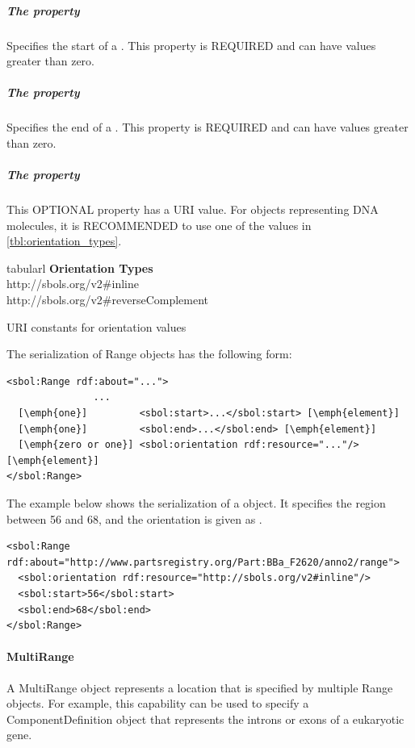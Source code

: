 \subparagraph{The  property}
Specifies the start of a . This property is REQUIRED and can have  values greater than zero.

\subparagraph{The  property}
Specifies the end of a . This property is REQUIRED and can have  values greater than zero.

\subparagraph{The  property}
This OPTIONAL property has a URI value. For  objects representing DNA molecules, it is RECOMMENDED to use one of the values in \ref{tbl:orientation_types}. 

\begin{table}[ht]
  \begin{edtable}{tabular}{l}
    \toprule
    \textbf{Orientation Types}  \\
    \midrule
    http://sbols.org/v2\#inline\\
    http://sbols.org/v2\#reverseComplement\\
    \bottomrule
  \end{edtable}
  \caption{URI constants for orientation values}
  \label{tbl:orientation_types}
\end{table}

The serialization of Range objects has the following form:
\begin{lstlisting}
<sbol:Range rdf:about="...">
               ...   
  [\emph{one}]         <sbol:start>...</sbol:start> [\emph{element}] 
  [\emph{one}]         <sbol:end>...</sbol:end> [\emph{element}] 
  [\emph{zero or one}] <sbol:orientation rdf:resource="..."/> [\emph{element}] 
</sbol:Range>
\end{lstlisting}

The example below shows the serialization of a  object. It specifies the region between 56 and 68, and the orientation is given as .
\begin{lstlisting}
<sbol:Range rdf:about="http://www.partsregistry.org/Part:BBa_F2620/anno2/range">
  <sbol:orientation rdf:resource="http://sbols.org/v2#inline"/>
  <sbol:start>56</sbol:start>
  <sbol:end>68</sbol:end>
</sbol:Range>
\end{lstlisting}

\paragraph{MultiRange}
\label{sec:MultiRange}
A MultiRange object represents a location that is specified by multiple Range objects. For example, this capability can be used to specify a ComponentDefinition object that represents the introns or exons of a eukaryotic gene.

